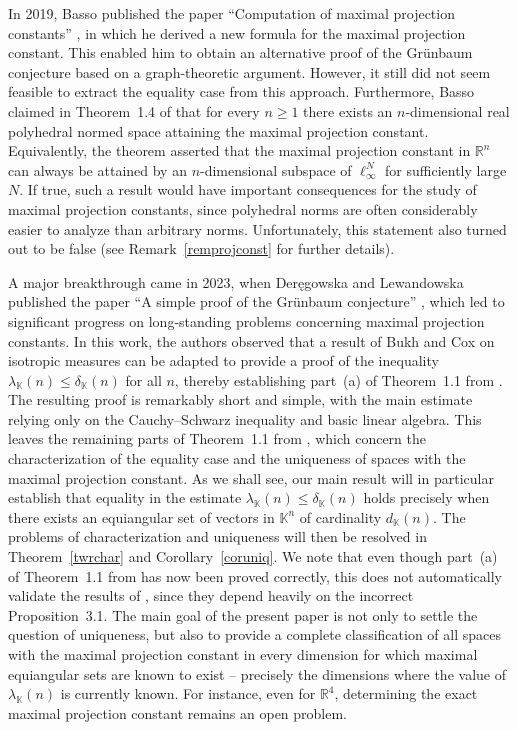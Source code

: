 \documentclass[12pt, reqno]{amsart}
\theoremstyle{definition}
\theoremstyle{remark}
\numberwithin{equation}{section}
\begin{document}
In 2019, Basso published the paper ``Computation of maximal projection constants'' \cite{basso}, in which he derived a new formula for the maximal projection constant. This enabled him to obtain an alternative proof of the Gr\"unbaum conjecture based on a graph-theoretic argument. However, it still did not seem feasible to extract the equality case from this approach. Furthermore, Basso claimed in Theorem~1.4 of \cite{basso} that for every $n \geq 1$ there exists an $n$-dimensional real polyhedral normed space attaining the maximal projection constant. Equivalently, the theorem asserted that the maximal projection constant in $\mathbb{R}^n$ can always be attained by an $n$-dimensional subspace of $\ell_{\infty}^N$ for sufficiently large $N$. If true, such a result would have important consequences for the study of maximal projection constants, since polyhedral norms are often considerably easier to analyze than arbitrary norms. Unfortunately, this statement also turned out to be false (see Remark~\ref{remprojconst} for further details).

A major breakthrough came in 2023, when Deręgowska and Lewandowska published the paper ``A simple proof of the Gr\"unbaum conjecture'' \cite{deregowskalewandowska}, which led to significant progress on long-standing problems concerning maximal projection constants. In this work, the authors observed that a result of Bukh and Cox \cite{bukhcox} on isotropic measures can be adapted to provide a proof of the inequality $\lambda_{\mathbb{K}}(n)\leq \delta_{\mathbb{K}}(n)$ for all $n$, thereby establishing part~(a) of Theorem~1.1 from \cite{konigtomczak}. The resulting proof is remarkably short and simple, with the main estimate relying only on the Cauchy--Schwarz inequality and basic linear algebra. This leaves the remaining parts of Theorem~1.1 from \cite{konigtomczak}, which concern the characterization of the equality case and the uniqueness of spaces with the maximal projection constant. As we shall see, our main result will in particular establish that equality in the estimate $\lambda_{\mathbb{K}}(n)\leq \delta_{\mathbb{K}}(n)$ holds precisely when there exists an equiangular set of vectors in $\mathbb{K}^n$ of cardinality $d_{\mathbb{K}}(n)$. The problems of characterization and uniqueness will then be resolved in Theorem~\ref{twrchar} and Corollary~\ref{coruniq}. We note that even though part~(a) of Theorem~1.1 from \cite{konigtomczak} has now been proved correctly, this does not automatically validate the results of \cite{konigtomczak2}, since they depend heavily on the incorrect Proposition~3.1. The main goal of the present paper is not only to settle the question of uniqueness, but also to provide a complete classification of all spaces with the maximal projection constant in every dimension for which maximal equiangular sets are known to exist -- precisely the dimensions where the value of $\lambda_{\mathbb{K}}(n)$ is currently known. For instance, even for $\mathbb{R}^4$, determining the exact maximal projection constant remains an open problem.
\end{document}
